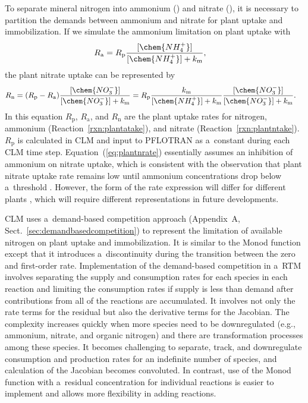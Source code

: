 \documentclass[gmdd, online, hvmath]{copernicus}
\begin{document}
      To separate mineral nitrogen into ammonium () and nitrate
      (), it is necessary to partition the demands between
      ammonium and nitrate for plant uptake and immobilization. If we
      simulate the ammonium limitation on plant uptake with
\begin{align}
 &
R_\mathrm{a} = R_\mathrm{p} \frac{[\chem{NH_4^+}]}{[\chem{NH_4^+}]+k_\mathrm{m}},
\label{eq:plantarate}
\end{align}%
      the plant nitrate uptake can be represented by
\begin{align}
 &
R_\mathrm{n} = (R_\mathrm{p} - R_\mathrm{a}) \frac{[\chem{NO_3^-}]}{[\chem{NO_3^-}]+k_\mathrm{m}} = R_\mathrm{p}
\frac{k_\mathrm{m}}{[\chem{NH_4^+}]+k_\mathrm{m}}
\frac{[\chem{NO_3^-}]}{[\chem{NO_3^-}]+k_\mathrm{m}}.
\label{eq:plantnrate}
\end{align}%
      In this equation $R_\mathrm{p}$, $R_\mathrm{a}$, and $R_\mathrm{n}$
      are the plant uptake rates for nitrogen, ammonium
      (Reaction~\ref{rxn:plantatake}), and nitrate
      (Reaction~\ref{rxn:plantntake}). $R_\mathrm{p}$ is calculated in CLM and input
      to PFLOTRAN as a~constant during each CLM time
      step. Equation~(\ref{eq:plantnrate}) essentially assumes an inhibition
      of ammonium on nitrate uptake, which is consistent with the
      observation that plant nitrate uptake rate remains low until ammonium
      concentrations drop below a~threshold \citep{eltrop1996}.  However,
      the form of the rate expression will differ for different plants
      \citep{Pfautsch2009,Warren2007,Nordin2001,Falkengren1995,Gherardi2013},
      which will require different representations in future developments.

      CLM uses a~demand-based competition approach (Appendix~A,
      Sect.~\ref{sec:demandbasedcompetition}) to represent the limitation of
      available nitrogen on plant uptake and immobilization. It is similar
      to the Monod function except that it introduces a~discontinuity during
      the transition between the zero and first-order rate. Implementation
      of the demand-based competition in a~RTM involves separating the
      supply and consumption rates for each species in each reaction and
      limiting the consumption rates if supply is less than demand after
      contributions from all of the reactions are accumulated. It involves
      not only the rate terms for the residual but also the derivative terms
      for the Jacobian. The complexity increases quickly when more species
      need to be downregulated (e.g., ammonium, nitrate, and organic
      nitrogen) and there are transformation processes among these
      species. It becomes challenging to separate, track, and downregulate
      consumption and production rates for an indefinite number of species,
      and calculation of the Jacobian becomes convoluted. In contrast, use
      of the Monod function with a~residual concentration for individual
      reactions is easier to implement and allows more flexibility in adding
      reactions.
\end{document}

